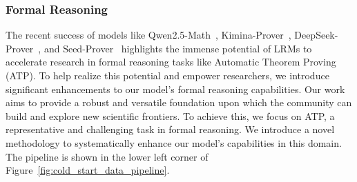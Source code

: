 \subsubsection{Formal Reasoning}
The recent success of models like Qwen2.5-Math~\citep{yang2024qwen2}, Kimina-Prover~\citep{wang2025kimina}, DeepSeek-Prover~\citep{Xin2025DeepSeek, Ren2025DeepSeek}, and Seed-Prover~\citep{chen2025seedproverdeepbroadreasoning} highlights the immense potential of LRMs to accelerate research in formal reasoning tasks like Automatic Theorem Proving (ATP). 
To help realize this potential and empower researchers, we introduce significant enhancements to our model's formal reasoning capabilities. 
Our work aims to provide a robust and versatile foundation upon which the community can build and explore new scientific frontiers.
To achieve this, we focus on ATP, a representative and challenging task in formal reasoning. 
We introduce a novel methodology to systematically enhance our model's capabilities in this domain.
The pipeline is shown in the lower left corner of Figure~\ref{fig:cold_start_data_pipeline}.





